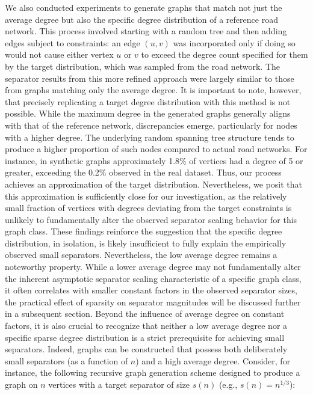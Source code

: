 We also conducted experiments to generate graphs that match not just the average degree but also the specific degree distribution of a reference road network.
This process involved starting with a random tree and then adding edges subject to constraints: an edge \((u, v)\) was incorporated only if doing so would not cause either vertex \(u\) or \(v\) to exceed the degree count specified for them by the target distribution, which was sampled from the road network.
The separator results from this more refined approach were largely similar to those from graphs matching only the average degree.
It is important to note, however, that precisely replicating a target degree distribution with this method is not possible.
While the maximum degree in the generated graphs generally aligns with that of the reference network, discrepancies emerge, particularly for nodes with a higher degree.
The underlying random spanning tree structure tends to produce a higher proportion of such nodes compared to actual road networks.
For instance, in synthetic graphs approximately 1.8\% of vertices had a degree of 5 or greater, exceeding the 0.2\% observed in the real dataset.
Thus, our process achieves an approximation of the target distribution.
Nevertheless, we posit that this approximation is sufficiently close for our investigation, as the relatively small fraction of vertices with degrees deviating from the target constraints is unlikely to fundamentally alter the observed separator scaling behavior for this graph class.
These findings reinforce the suggestion that the specific degree distribution, in isolation, is likely insufficient to fully explain the empirically observed small separators.
Nevertheless, the low average degree remains a noteworthy property.
While a lower average degree may not fundamentally alter the inherent asymptotic separator scaling characteristic of a specific graph class, it often correlates with smaller constant factors in the observed separator sizes,
the practical effect of sparsity on separator magnitudes will be discussed further in a subsequent section.
Beyond the influence of average degree on constant factors, it is also crucial to recognize that neither a low average degree nor a specific sparse degree distribution is a strict prerequisite for achieving small separators.
Indeed, graphs can be constructed that possess both deliberately small separators (as a function of \(n\)) and a high average degree.
Consider, for instance, the following recursive graph generation scheme designed to produce a graph on \(n\) vertices with a target separator of size \(s(n)\) (e.g., \(s(n) = n^{1/3}\)):
